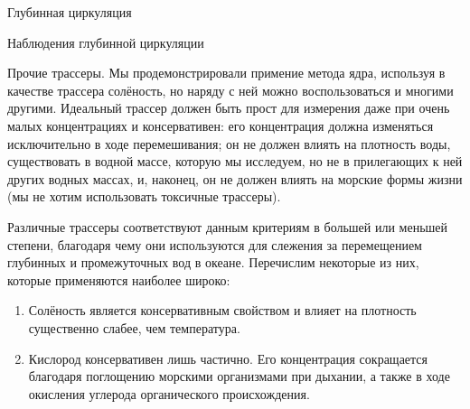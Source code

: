 \begin{chapter}{Глубинная циркуляция}
\begin{section}{Наблюдения глубинной циркуляции}
\begin{paragraph}{Прочие трассеры.}
Мы продемонстрировали примение
метода ядра, используя в качестве трассера солёность, но наряду с ней можно
воспользоваться и многими другими. Идеальный трассер должен быть прост для
измерения даже при очень малых концентрациях и консервативен: его концентрация
должна изменяться исключительно в ходе 
перемешивания; он не должен влиять на плотность
воды, существовать в водной массе, которую мы исследуем, но не в прилегающих
к ней других водных массах, и, наконец, он не должен влиять на морские
формы жизни (мы не хотим использовать токсичные трассеры).
%

Различные трассеры соответствуют данным критериям в большей или меньшей
степени, благодаря чему они используются для слежения за перемещением 
глубинных и промежуточных вод в океане. Перечислим некоторые из них,
которые применяются наиболее широко:
%
\begin{enumerate}
\item 
Солёность является консервативным свойством и влияет на плотность существенно
слабее, чем температура.
%

\item 
Кислород консервативен лишь частично. Его концентрация сокращается благодаря
поглощению морскими организмами при дыхании, а также в ходе окисления 
углерода органического происхождения.
%


\end{enumerate}
\end{paragraph}
\end{section}
\end{chapter}
